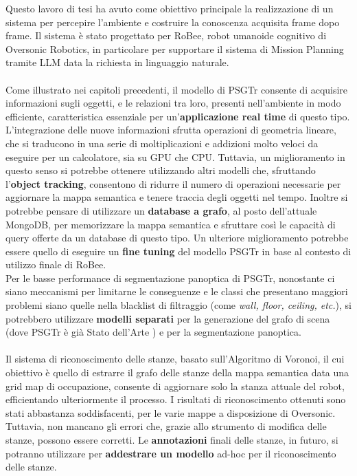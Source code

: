 Questo lavoro di tesi ha avuto come obiettivo principale la realizzazione di un sistema per percepire l'ambiente e costruire la conoscenza acquisita frame dopo frame. Il sistema è stato progettato per RoBee, robot umanoide cognitivo di Oversonic Robotics, in particolare per supportare il sistema di Mission Planning tramite LLM data la richiesta in linguaggio naturale. \\
\\
Come illustrato nei capitoli precedenti, il modello di PSGTr consente di acquisire informazioni sugli oggetti, e le relazioni tra loro, presenti nell'ambiente in modo efficiente, caratteristica essenziale per un'\textbf{applicazione real time} di questo tipo. L'integrazione delle nuove informazioni sfrutta operazioni di geometria lineare, che si traducono in una serie di moltiplicazioni e addizioni molto veloci da eseguire per un calcolatore, sia su GPU che CPU. Tuttavia, un miglioramento in questo senso si potrebbe ottenere utilizzando altri modelli che, sfruttando l'\textbf{object tracking}, consentono di ridurre il numero di operazioni necessarie per aggiornare la mappa semantica e tenere traccia degli oggetti nel tempo. Inoltre si potrebbe pensare di utilizzare un \textbf{database a grafo}, al posto dell'attuale MongoDB, per memorizzare la mappa semantica e sfruttare così le capacità di query offerte da un database di questo tipo. Un ulteriore miglioramento potrebbe essere quello di eseguire un \textbf{fine tuning} del modello PSGTr in base al contesto di utilizzo finale di RoBee.\\
Per le basse performance di segmentazione panoptica di PSGTr, nonostante ci siano meccanismi per limitarne le conseguenze e le classi che presentano maggiori problemi siano quelle nella blacklist di filtraggio (come \textit{wall, floor, ceiling, etc.}), si potrebbero utilizzare \textbf{modelli separati} per la generazione del grafo di scena (dove PSGTr è già Stato dell'Arte ) e per la segmentazione panoptica.\\
\\
Il sistema di riconoscimento delle stanze, basato sull'Algoritmo di Voronoi, il cui obiettivo è quello di estrarre il grafo delle stanze della mappa semantica data una grid map di occupazione, consente di aggiornare solo la stanza attuale del robot, efficientando ulteriormente il processo. I risultati di riconoscimento ottenuti sono stati abbastanza soddisfacenti, per le varie mappe a disposizione di Oversonic. Tuttavia, non mancano gli errori che, grazie allo strumento di modifica delle stanze, possono essere corretti. Le \textbf{annotazioni} finali delle stanze, in futuro, si potranno utilizzare per \textbf{addestrare un modello} ad-hoc per il riconoscimento delle stanze.
